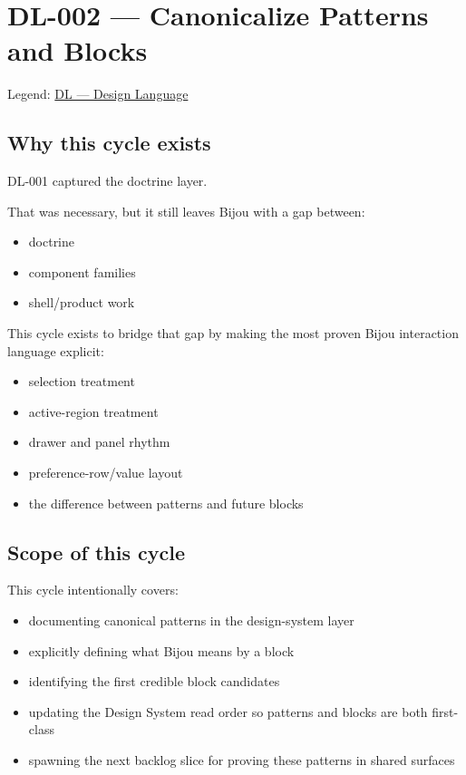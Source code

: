 \chapter{DL-002 --- Canonicalize Patterns and Blocks}\label{record-169}

\smallskip

Legend: \href{https://github.com/flyingrobots/bijou/blob/1853ad902f6bf219326409e7f743a5a1d6517dbc/docs/legends/DL-design-language.md}{DL --- Design Language}

\section{Why this cycle exists}\label{record-169-why-this-cycle-exists}

DL-001 captured the doctrine layer.

That was necessary, but it still leaves Bijou with a gap between:

\begin{itemize}
\tightlist
\item
  doctrine
\item
  component families
\item
  shell/product work
\end{itemize}

This cycle exists to bridge that gap by making the most proven Bijou interaction language explicit:

\begin{itemize}
\tightlist
\item
  selection treatment
\item
  active-region treatment
\item
  drawer and panel rhythm
\item
  preference-row/value layout
\item
  the difference between patterns and future blocks
\end{itemize}

\section{Scope of this cycle}\label{record-169-scope-of-this-cycle}

This cycle intentionally covers:

\begin{itemize}
\tightlist
\item
  documenting canonical patterns in the design-system layer
\item
  explicitly defining what Bijou means by a block
\item
  identifying the first credible block candidates
\item
  updating the Design System read order so patterns and blocks are both first-class
\item
  spawning the next backlog slice for proving these patterns in shared surfaces
\end{itemize}

